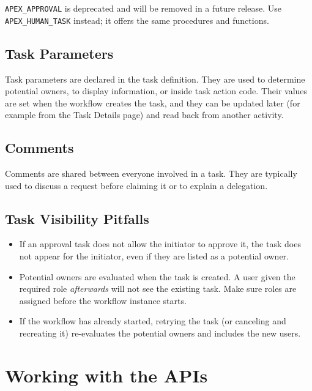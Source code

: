 \documentclass[11pt,a4paper]{article}
\begin{document}
\begin{warn}
\texttt{APEX\_APPROVAL} is deprecated and will be removed in a future release. Use \texttt{APEX\_HUMAN\_TASK} instead; it offers the same procedures and functions.
\end{warn}

\subsection{Task Parameters}
Task parameters are declared in the task definition. They are used to determine potential owners, to display information, or inside task action code. Their values are set when the workflow creates the task, and they can be updated later (for example from the Task Details page) and read back from another activity.

\subsection{Comments}
Comments are shared between everyone involved in a task. They are typically used to discuss a request before claiming it or to explain a delegation.

\subsection{Task Visibility Pitfalls}
\begin{itemize}
\item If an approval task does not allow the initiator to approve it, the task does not appear for the initiator, even if they are listed as a potential owner.
\item Potential owners are evaluated when the task is created. A user given the required role \emph{afterwards} will not see the existing task. Make sure roles are assigned before the workflow instance starts.
\item If the workflow has already started, retrying the task (or canceling and recreating it) re-evaluates the potential owners and includes the new users.
\end{itemize}

\section{Working with the APIs}
\label{sec:views}
\end{document}
